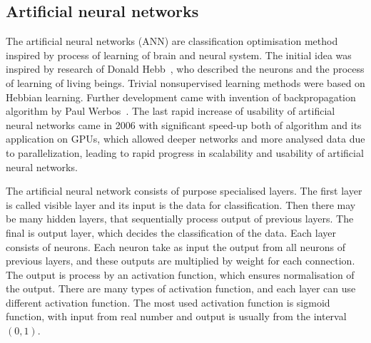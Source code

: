 \documentclass[
  print, %
  Table,   %
  nolof,     %
  nolot,     %
  11pt, %
  oneside  %
]{fithesis3}
\begin{document}
\subsection{Artificial neural networks}
\label{subsec:opt-other-ann}


The artificial neural networks (ANN) are classification optimisation method inspired by process of learning of brain and neural system. The initial idea was inspired by research of Donald Hebb~\cite{hebb49learning}, who described the neurons and the process of learning of living beings. Trivial nonsupervised learning methods were based on Hebbian learning. Further development came with invention of backpropagation algorithm by Paul Werbos~\cite{werbos75beyondThesis}. The last rapid increase of usability of artificial neural networks came in 2006 with significant speed-up both of algorithm and its application on GPUs, which allowed deeper networks and more analysed data due to parallelization, leading to rapid progress in scalability and usability of artificial neural networks.

The artificial neural network consists of purpose specialised layers. The first layer is called visible layer and its input is the data for classification. Then there may be many hidden layers, that sequentially process output of previous layers. The final is output layer, which decides the classification of the data. Each layer consists of neurons. Each neuron take as input the output from all neurons of previous layers, and these outputs are multiplied by weight for each connection. The output is process by an activation function, which ensures normalisation of the output. There are many types of activation function, and each layer can use different activation function. The most used activation function is sigmoid function, with input from real number and output is usually from the interval $(0, 1)$.
\end{document}
